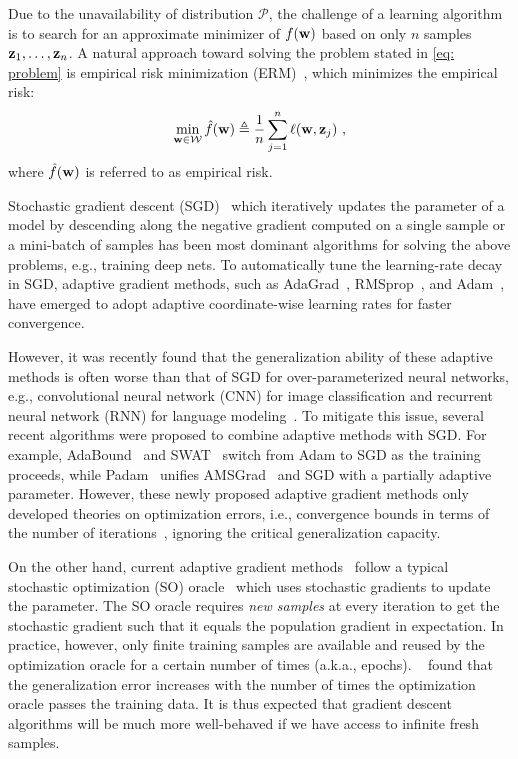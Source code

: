 \documentclass[11pt]{article}
\begin{document}
Due to the unavailability of distribution $\mathcal{P}$,  the
challenge of a learning algorithm is to search for an approximate minimizer of $f(\mathbf{w})$ based on only 
$n$ samples $\mathbf{z}_{1}, \dots, \mathbf{z}_{n}$.
A natural approach toward solving the problem stated in \eqref{eq: problem} is empirical risk minimization (ERM)~\citep{shbe14}, which minimizes the empirical risk:
\begin{equation} \label{eq: empirical}
   \min_{\w \in \cW}  
   \hat f(\w)  \triangleq \frac{1}{n}\sum_{j =1}^{n} \ell(\w, \z_j)~,
\end{equation}
where $\hat f(\mathbf{w})$ is referred to as empirical risk. 

Stochastic gradient descent (SGD)~\citep{romo51}
which iteratively updates the parameter of a model by descending along the negative gradient computed on a single sample or a mini-batch of samples has been most dominant algorithms for solving the above problems, e.g., training deep nets. To automatically tune the learning-rate decay in SGD, adaptive gradient methods, such as AdaGrad~\citep{duha11}, RMSprop~\citep{tige12}, and Adam~\citep{kiba15}, have emerged to adopt adaptive coordinate-wise learning rates for faster convergence.

However, it was recently found that the generalization ability of these adaptive methods is often worse than that of SGD for over-parameterized neural networks, e.g., convolutional neural network (CNN) for image classification and recurrent neural network (RNN) for language modeling~\citep{wiro17}. To mitigate this issue, several recent algorithms were proposed to combine adaptive methods with SGD.
For example, AdaBound~\citep{luxi2019} and SWAT~\citep{keso2017} switch from Adam to SGD as the training proceeds, while Padam~\citep{chgu2018, zhta18} unifies AMSGrad~\citep{reka2018} and SGD with a partially adaptive parameter.  However, these newly proposed adaptive gradient methods only developed theories on optimization errors, i.e., convergence bounds in terms of the number of iterations~\citep{zare18,wawu19, zosh2019, cheli2019}, %
ignoring the critical generalization capacity. %

On the other hand, current adaptive gradient methods~\citep{duha11,kiba15,tige12, reka2018, wawu19} follow a typical stochastic optimization (SO) oracle~\citep{romo51, ghla2013} which uses stochastic gradients to update the parameter. The SO oracle requires \emph{new samples} at every iteration to get the stochastic gradient such that it equals the population gradient in expectation. In practice, however, only finite training samples are available and reused by the optimization oracle for a certain number of times (a.k.a., epochs). ~\citet{hare2016} found that the generalization error increases with the number of times the optimization oracle passes the training data. It is thus expected that gradient descent algorithms
will be much more well-behaved if we have access to infinite fresh samples.
\end{document}
